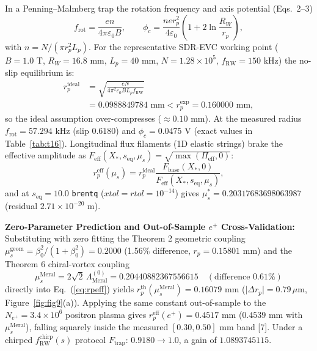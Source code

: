\documentclass[12pt,a4paper]{article}
\begin{document}
In a Penning--Malmberg trap the rotation frequency and axis potential (Eqs.\ 2--3)
\begin{equation}
f_{\mathrm{rot}} = \frac{en}{4\pi\varepsilon_0 B}, \qquad
\phi_c = \frac{ner_p^2}{4\varepsilon_0}\left(1 + 2\ln\frac{R_W}{r_p}\right),
\label{eq:trapbase}
\end{equation}
with $n = N/(\pi r_p^2 L_p)$. For the representative SDR-EVC working point ($B=1.0\text{ T}$, $R_W=16.8\text{ mm}$, $L_p=40\text{ mm}$, $N=1.28\times10^5$, $f_{\mathrm{RW}}=150\text{ kHz}$) the no-slip equilibrium is:
\begin{equation}
\begin{split}
r_p^{\mathrm{ideal}} &= \sqrt{\frac{eN}{4\pi^2\varepsilon_0 B L_p f_{\mathrm{RW}}}} \\
&= 0.0988849784\text{ mm} < r_p^{\mathrm{exp}} = 0.160000\text{ mm},
\end{split}
\label{eq:rpideal}
\end{equation}
so the ideal assumption over-compresses ($\approx 0.10\text{ mm}$). At the measured radius $f_{\mathrm{rot}} = 57.294\text{ kHz}$ (slip $0.6180$) and $\phi_c = 0.0475\text{ V}$ (exact values in Table~\ref{tab:t16}). Longitudinal flux filaments (1D elastic strings) brake the effective amplitude as $F_{\mathrm{eff}}(X_*,s_{\mathrm{eq}},\mu_s) = \sqrt{\max(\Pi_{\mathrm{eff}},0)}$:
\begin{equation}
r_p^{\mathrm{eff}}(\mu_s) = r_p^{\mathrm{ideal}} \frac{F_{\mathrm{base}}(X_*,0)}{F_{\mathrm{eff}}(X_*,s_{\mathrm{eq}},\mu_s)},
\label{eq:rpeff}
\end{equation}
and at $s_{\mathrm{eq}}=10.0$ \texttt{brentq} ($xtol=rtol=10^{-14}$) gives $\mu_s^* = 0.20317683698063987$ (residual $2.71\times 10^{-20}\text{ m}$).

\textbf{Zero-Parameter Prediction and Out-of-Sample $e^+$ Cross-Validation:} Substituting with zero fitting the Theorem 2 geometric coupling $\mu_s^{\mathrm{geom}} = \beta_0^2/(1+\beta_0^2) = 0.2000$ (1.56\% difference, $r_p = 0.15801\text{ mm}$) and the Theorem 6 chiral-vortex coupling
\begin{equation}
\mu_s^{\mathrm{Meral}} = 2\sqrt{2}\,\Lambda_{\mathrm{Meral}}^{(0)} = 0.20440882367556615 \quad (\text{difference } 0.61\%)
\label{eq:mumeral}
\end{equation}
directly into Eq.\ (\ref{eq:rpeff}) yields $r_p^{\mathrm{th}}(\mu_s^{\mathrm{Meral}}) = 0.16079\text{ mm}$ ($\vert{}\Delta r_p\vert{} = 0.79\,\mu\text{m}$, Figure~\ref{fig:fig9}(a)). Applying the same constant out-of-sample to the $N_{e^+}=3.4\times 10^6$ positron plasma gives $r_p^{\mathrm{eff}}(e^+) = 0.4517\text{ mm}$ ($0.4539\text{ mm}$ with $\mu_s^{\mathrm{Meral}}$), falling squarely inside the measured $[0.30, 0.50]\text{ mm}$ band [7]. Under a chirped $f_{\mathrm{RW}}^{\mathrm{chirp}}(s)$ protocol $F_{\mathrm{trap}}$: $0.9180\to1.0$, a gain of $1.0893745115$.
\end{document}
